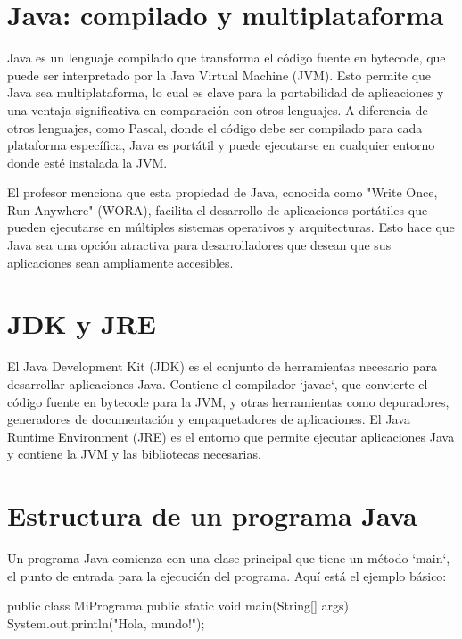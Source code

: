 \documentclass[a4paper]{report}
\begin{document}
\section{Java: compilado y multiplataforma}

Java es un lenguaje compilado que transforma el código fuente en bytecode, que puede ser interpretado por la Java Virtual Machine (JVM). Esto permite que Java sea multiplataforma, lo cual es clave para la portabilidad de aplicaciones y una ventaja significativa en comparación con otros lenguajes. A diferencia de otros lenguajes, como Pascal, donde el código debe ser compilado para cada plataforma específica, Java es portátil y puede ejecutarse en cualquier entorno donde esté instalada la JVM.



El profesor menciona que esta propiedad de Java, conocida como "Write Once, Run Anywhere" (WORA), facilita el desarrollo de aplicaciones portátiles que pueden ejecutarse en múltiples sistemas operativos y arquitecturas. Esto hace que Java sea una opción atractiva para desarrolladores que desean que sus aplicaciones sean ampliamente accesibles.



\section{JDK y JRE}

El Java Development Kit (JDK) es el conjunto de herramientas necesario para desarrollar aplicaciones Java. Contiene el compilador `javac`, que convierte el código fuente en bytecode para la JVM, y otras herramientas como depuradores, generadores de documentación y empaquetadores de aplicaciones. El Java Runtime Environment (JRE) es el entorno que permite ejecutar aplicaciones Java y contiene la JVM y las bibliotecas necesarias.



\section{Estructura de un programa Java}

Un programa Java comienza con una clase principal que tiene un método `main`, el punto de entrada para la ejecución del programa. Aquí está el ejemplo básico:

\begin{roundedlst}
    public class MiPrograma {
        public static void main(String[] args) {
            System.out.println("Hola, mundo!");
        }
    }
\end{roundedlst}
\end{document}
